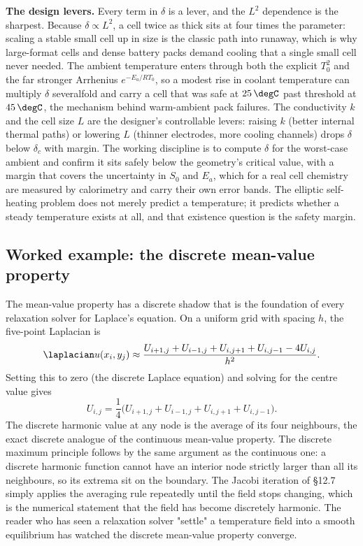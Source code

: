 \textbf{The design levers.} Every term in $\delta$ is a lever, and
the $L^{2}$ dependence is the sharpest. Because $\delta \propto L^{2}$,
a cell twice as thick sits at four times the parameter: scaling a
stable small cell up in size is the classic path into runaway, which
is why large-format cells and dense battery packs demand cooling that
a single small cell never needed. The ambient temperature enters
through both the explicit $T_{0}^{2}$ and the far stronger Arrhenius
$e^{-E_{a}/RT_{0}}$, so a modest rise in coolant temperature can
multiply $\delta$ severalfold and carry a cell that was safe at
$25\,\degC$ past threshold at $45\,\degC$, the mechanism behind
warm-ambient pack failures. The conductivity $k$ and the cell size
$L$ are the designer's controllable levers: raising $k$ (better
internal thermal paths) or lowering $L$ (thinner electrodes, more
cooling channels) drops $\delta$ below $\delta_{c}$ with margin. The
working discipline is to compute $\delta$ for the worst-case ambient
and confirm it sits safely below the geometry's critical value, with
a margin that covers the uncertainty in $S_{0}$ and $E_{a}$, which for
a real cell chemistry are measured by calorimetry and carry their own
error bands. The elliptic self-heating problem does not merely predict
a temperature; it predicts whether a steady temperature exists at all,
and that existence question is the safety margin.



\subsection{Worked example: the discrete mean-value property}

The mean-value property has a discrete shadow that is the
foundation of every relaxation solver for Laplace's equation. On a
uniform grid with spacing $h$, the five-point Laplacian is
\[
\laplacian u(x_{i}, y_{j}) \approx \frac{U_{i+1,j} + U_{i-1,j} + U_{i,j+1} + U_{i,j-1} - 4 U_{i,j}}{h^{2}}.
\]
Setting this to zero (the discrete Laplace equation) and solving for
the centre value gives
\[
U_{i,j} = \frac{1}{4}\bigl(U_{i+1,j} + U_{i-1,j} + U_{i,j+1} + U_{i,j-1}\bigr).
\]
The discrete harmonic value at any node is the average of its four
neighbours, the exact discrete analogue of the continuous
mean-value property. The discrete maximum principle follows by the
same argument as the continuous one: a discrete harmonic function
cannot have an interior node strictly larger than all its
neighbours, so its extrema sit on the boundary. The Jacobi
iteration of \S12.7 simply applies the averaging rule repeatedly
until the field stops changing, which is the numerical statement
that the field has become discretely harmonic. The reader who has
seen a relaxation solver "settle" a temperature field into a smooth
equilibrium has watched the discrete mean-value property converge.

